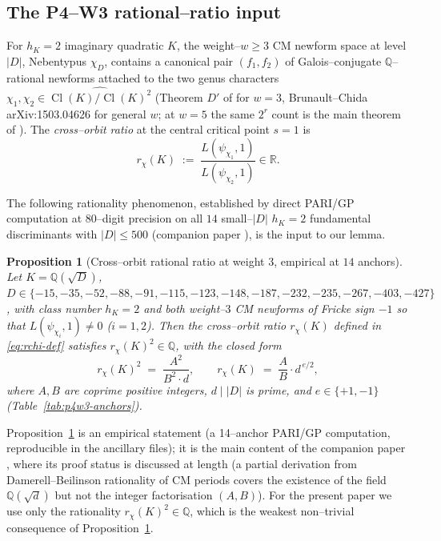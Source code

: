 \documentclass[11pt]{amsart}
\newtheorem{proposition}[theorem]{Proposition}
\theoremstyle{definition}
\theoremstyle{remark}
\DeclareMathOperator{\Cl}{Cl}
\newcommand{\Q}{\mathbb{Q}}
\newcommand{\R}{\mathbb{R}}
\begin{document}
\subsection{The P4--W3 rational--ratio input}\label{ssec:p4w3-intro}
For \(h_K = 2\) imaginary quadratic \(K\), the weight--\(w \ge 3\)
CM newform space at level \(|D|\), Nebentypus \(\chi_D\), contains a
canonical pair \((f_1, f_2)\) of Galois--conjugate \(\Q\)--rational
newforms attached to the two genus characters
\(\chi_1, \chi_2 \in \widehat{\Cl(K)/\Cl(K)^2}\) (Theorem \(D'\) of
\cite{Schutt2008} for \(w = 3\), Brunault--Chida \cite{BrunaultChida2015}
arXiv:1503.04626 for general \(w\); at \(w = 5\) the same
\(2^r\) count is the main theorem of \cite{Remondiere2026}). The
\emph{cross--orbit ratio} at the central critical point \(s = 1\) is
\begin{equation}\label{eq:rchi-def}
   r_\chi(K) \;:=\;
   \frac{L(\psi_{\chi_1}, 1)}{L(\psi_{\chi_2}, 1)} \in \R .
\end{equation}

The following rationality phenomenon, established by direct PARI/GP
computation at \(80\)--digit precision on all \(14\) small--\(|D|\)
\(h_K = 2\) fundamental discriminants with \(|D| \le 500\)
(companion paper \cite{Remondiere2026bsd}), is the
input to our lemma.

\begin{proposition}[Cross--orbit rational ratio at weight \(3\),
empirical at \(14\) anchors]\label{prop:p4w3}
Let \(K = \Q(\sqrt D)\), \(D \in \{-15, -35, -52, -88, -91, -115, -123,
-148, -187, -232, -235, -267, -403, -427\}\), with class number
\(h_K = 2\) and both weight--\(3\) CM newforms of Fricke sign \(-1\) so
that \(L(\psi_{\chi_i}, 1) \neq 0\) (\(i = 1, 2\)). Then the cross--orbit
ratio \(r_\chi(K)\) defined in \eqref{eq:rchi-def} satisfies
\(r_\chi(K)^2 \in \Q\), with the closed form
\[
   r_\chi(K)^2 \;=\; \frac{A^2}{B^2 \cdot d} ,
   \qquad
   r_\chi(K) \;=\; \frac{A}{B} \cdot d^{\,e/2} ,
\]
where \(A, B\) are coprime positive integers, \(d \mid |D|\) is prime,
and \(e \in \{+1, -1\}\) (Table~\ref{tab:p4w3-anchors}).
\end{proposition}

Proposition~\ref{prop:p4w3} is an empirical statement (a 14--anchor
PARI/GP computation, reproducible in the ancillary files); it is the
main content of the companion paper \cite{Remondiere2026bsd}, where its
proof status is discussed at length (a partial derivation from
Damerell--Beilinson rationality of CM periods covers the existence of
the field \(\Q(\sqrt d)\) but not the integer factorisation
\((A, B)\)). For the present paper we use only the rationality
\(r_\chi(K)^2 \in \Q\), which is the weakest non--trivial consequence
of Proposition~\ref{prop:p4w3}.
\end{document}
